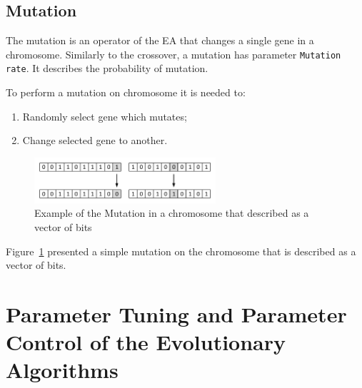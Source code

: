 \subsection{Mutation}\label{sec:GeneticAlgorithmMutation}

The mutation is an operator of the EA that changes a single gene in a chromosome. Similarly to the crossover, a mutation has parameter \texttt{Mutation rate}. It describes the probability of mutation.

To perform a mutation on chromosome it is needed to:

\begin{enumerate}
	\item Randomly select gene which mutates;
	\item Change selected gene to another.
\end{enumerate}

\begin{figure}
	\centering
	\includegraphics[width=0.6\textwidth]{images/mutationVector.pdf}
	\caption[Example of the Mutation]{Example of the Mutation in a chromosome that described as a vector of bits}
	\label{fig:MutationVector}
\end{figure}

Figure~\ref{fig:MutationVector} presented a simple mutation on the chromosome that is described as a vector of bits.


\section{Parameter Tuning and Parameter Control of the Evolutionary Algorithms}

